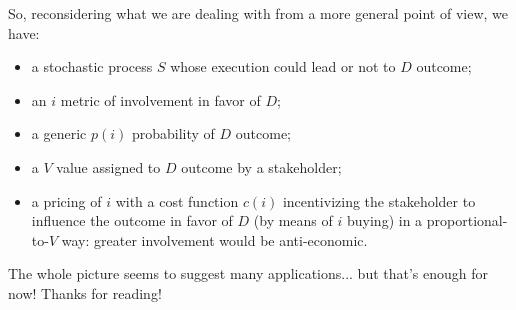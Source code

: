 \documentclass[10pt,a4paper]{article}
\begin{document}
	So, reconsidering what we are dealing with from a more general point of view, we have:
	\begin{itemize}
		\item a stochastic process $S$ whose execution could lead or not to $D$ outcome;
		\item an $i$ metric of involvement in favor of $D$;
		\item a generic $p(i)$ probability of $D$ outcome;
		\item a $V$ value assigned to $D$ outcome by a stakeholder;
		\item a pricing of $i$ with a cost function $c(i)$ incentivizing the stakeholder to influence the outcome in favor of $D$ (by means of $i$ buying) in a proportional-to-$V$ way: greater involvement would be anti-economic.
	\end{itemize}
	The whole picture seems to suggest many applications... but that’s enough for now! Thanks for reading!
\end{document}
